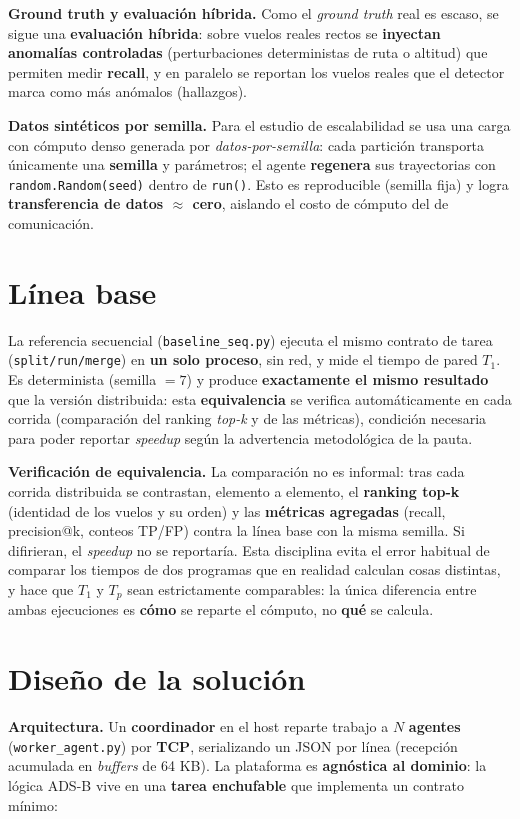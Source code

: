 \documentclass[letterpaper,11pt]{article}
\begin{document}
\textbf{Ground truth y evaluación híbrida.} Como el \emph{ground truth} real es escaso, se sigue una
\textbf{evaluación híbrida}: sobre vuelos reales rectos se \textbf{inyectan anomalías controladas}
(perturbaciones deterministas de ruta o altitud) que permiten medir \textbf{recall}, y en paralelo se
reportan los vuelos reales que el detector marca como más anómalos (hallazgos).

\textbf{Datos sintéticos por semilla.} Para el estudio de escalabilidad se usa una carga con cómputo denso
generada por \emph{datos-por-semilla}: cada partición transporta únicamente una \textbf{semilla} y
parámetros; el agente \textbf{regenera} sus trayectorias con \texttt{random.Random(seed)} dentro de
\texttt{run()}. Esto es reproducible (semilla fija) y logra \textbf{transferencia de datos $\approx$ cero},
aislando el costo de cómputo del de comunicación.

\section{Línea base}
La referencia secuencial (\texttt{baseline\_seq.py}) ejecuta el mismo contrato de tarea
(\texttt{split/run/merge}) en \textbf{un solo proceso}, sin red, y mide el tiempo de pared $T_1$. Es
determinista (semilla $=7$) y produce \textbf{exactamente el mismo resultado} que la versión distribuida:
esta \textbf{equivalencia} se verifica automáticamente en cada corrida (comparación del ranking
\emph{top-k} y de las métricas), condición necesaria para poder reportar \emph{speedup} según la
advertencia metodológica de la pauta.

\textbf{Verificación de equivalencia.} La comparación no es informal: tras cada corrida distribuida se
contrastan, elemento a elemento, el \textbf{ranking top-k} (identidad de los vuelos y su orden) y las
\textbf{métricas agregadas} (recall, precision@k, conteos TP/FP) contra la línea base con la misma semilla.
Si difirieran, el \emph{speedup} no se reportaría. Esta disciplina evita el error habitual de comparar los
tiempos de dos programas que en realidad calculan cosas distintas, y hace que $T_1$ y $T_p$ sean
estrictamente comparables: la única diferencia entre ambas ejecuciones es \textbf{cómo} se reparte el
cómputo, no \textbf{qué} se calcula.

\section{Diseño de la solución}
\textbf{Arquitectura.} Un \textbf{coordinador} en el host reparte trabajo a $N$ \textbf{agentes}
(\texttt{worker\_agent.py}) por \textbf{TCP}, serializando un JSON por línea (recepción acumulada en
\emph{buffers} de 64 KB). La plataforma es \textbf{agnóstica al dominio}: la lógica ADS-B vive en una
\textbf{tarea enchufable} que implementa un contrato mínimo:
\end{document}
